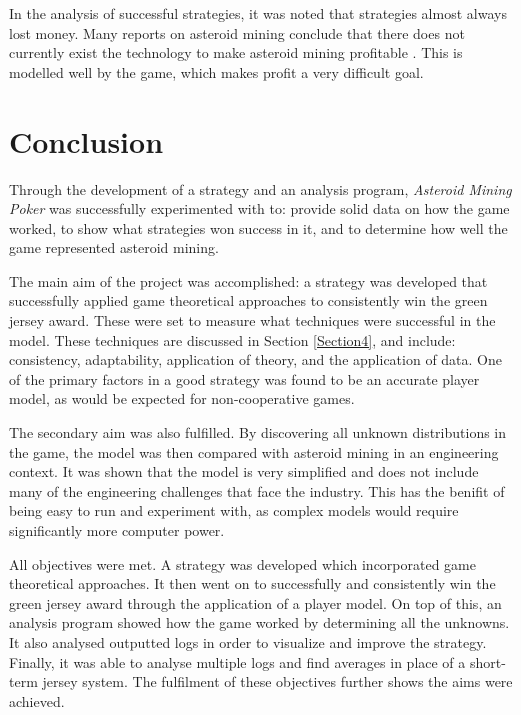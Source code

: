 \documentclass[11pt, twoside]{article}
\begin{document}
In the analysis of successful strategies, it was noted that strategies almost always lost money. Many reports on asteroid mining conclude that there does not currently exist the technology to make asteroid mining profitable \cite{ross2001near}. This is modelled well by the game, which makes profit a very difficult goal.

\newpage

\section{Conclusion}

Through the development of a strategy and an analysis program, \textit{Asteroid Mining Poker} was successfully experimented with to: provide solid data on how the game worked, to show what strategies won success in it, and to determine how well the game represented asteroid mining.

The main aim of the project was accomplished: a strategy was developed that successfully applied game theoretical approaches to consistently win the green jersey award. These were set to measure what techniques were successful in the model. These techniques are discussed in Section \ref{Section4}, and include: consistency, adaptability, application of theory, and the application of data. One of the primary factors in a good strategy was found to be an accurate player model, as would be expected for non-cooperative games.

The secondary aim was also fulfilled. By discovering all unknown distributions in the game, the model was then compared with asteroid mining in an engineering context. It was shown that the model is very simplified and does not include many of the engineering challenges that face the industry. This has the benifit of being easy to run and experiment with, as complex models would require significantly more computer power.

All objectives were met. A strategy was developed which incorporated game theoretical approaches. It then went on to successfully and consistently win the green jersey award through the application of a player model. On top of this, an analysis program showed how the game worked by determining all the unknowns. It also analysed outputted logs in order to visualize and improve the strategy. Finally, it was able to analyse multiple logs and find averages in place of a short-term jersey system. The fulfilment of these objectives further shows the aims were achieved.
\end{document}
